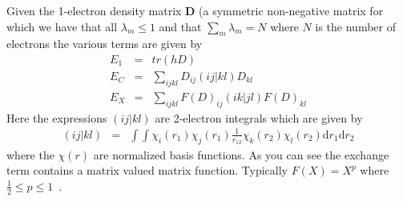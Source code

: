 \documentclass{article}
\begin{document}
Given the 1-electron density matrix \(\mathbf{D}\) (a symmetric non-negative
matrix for which we have that all \(\lambda_m \le 1\) and that
\(\sum_m \lambda_m = N\) where \(N\) is the number of electrons the various
terms are given by
\begin{eqnarray}
   E_1 &=& tr(h D) \\
   E_C &=& \sum_{ijkl}D_{ij}(ij|kl)D_{kl} \\
   E_X &=& \sum_{ijkl}F(D)_{ij}(ik|jl)F(D)_{kl} 
\end{eqnarray}
Here the expressions \((ij|kl)\) are 2-electron integrals which are given by
\begin{eqnarray}
  (ij|kl) &=& \int\int \chi_i(r_1)\chi_j(r_1)\frac{1}{r_{12}}\chi_k(r_2)\chi_l(r_2) \mathrm{d}r_1\mathrm{d}r_2
\end{eqnarray}
where the \(\chi(r)\) are normalized basis functions.
As you can see the exchange term contains a matrix valued matrix function. 
Typically \(F(X) = X^p\) where \(\frac{1}{2} \le p \le 1\)~\cite{lathiotakis09}.



\end{document}

